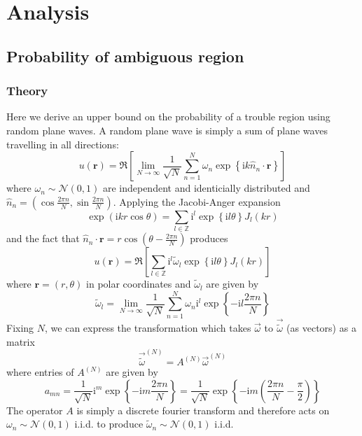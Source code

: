 \documentclass{report}
\newcommand{\rr}[0]{\mathbf{r}}
\begin{document}
\section{Analysis}

\subsection{Probability of ambiguous region}

\subsubsection{Theory}
Here we derive an upper bound on the probability of a trouble region using random plane waves. A random plane wave is simply a sum of plane waves travelling in all directions:
\[
u(\rr) = \Re \left[ \lim_{N \rightarrow \infty} \frac{1}{\sqrt{N}} \sum_{n=1}^{N} \omega_{n} \exp{\left\{\mathrm{i} k \hat{n}_{n} \cdot \rr \right\}} \right]
\]
where $\omega_{n} \sim \mathcal{N}(0,1)$ are independent and identicially distributed and $\hat{n}_{n} = (\cos \frac {2 \pi n}{N}, \sin \frac {2 \pi n}{N})$. Applying the Jacobi-Anger expansion \cite{abramowitz}
\[
\exp(\mathrm{i} k r \cos \theta) = \sum_{l \in \mathbb{Z}} \mathrm{i}^{l} \exp{\left\{\mathrm{i} l \theta \right\}} J_{l}(kr)
\]
and the fact that $\hat{n}_{n} \cdot \rr = r \cos{ \left( \theta - \frac{2 \pi n}{N} \right) }$ produces
\begin{equation}
  \label{eq:rpw_bessel_expansion}
  u(\rr) = \Re \left[ \sum_{l \in \mathbb{Z}} \mathrm{i}^{l} \tilde{\omega}_{l} \exp{\left\{\mathrm{i} l \theta \right\}} J_{l}(kr) \right]
\end{equation}
where $\rr = (r, \theta)$ in polar coordinates and $\tilde{\omega}_{l}$ are given by
\[
\tilde{\omega}_{l} = \lim_{N \rightarrow \infty} \frac{1}{\sqrt{N}} \sum_{n=1}^{N} \omega_{n} \mathrm{i}^{l} \exp{\left\{-\mathrm{i} l \frac{2 \pi n}{N} \right\}}
\]
Fixing $N$, we can express the transformation which takes $\overrightarrow{\omega}$ to $\overrightarrow{\tilde{\omega}}$ (as vectors) as a matrix
\[
\overrightarrow{\tilde{\omega}}^{(N)} = A^{(N)} \overrightarrow{\omega}^{(N)}
\]
where entries of $A^{(N)}$ are given by
\[
a_{mn} = \frac{1}{\sqrt{N}} \mathrm{i}^{m} \exp{\left\{-\mathrm{i} m \frac{2 \pi n}{N} \right\}} = \frac{1}{\sqrt{N}} \exp{\left\{-\mathrm{i} m \left(\frac{2 \pi n}{N} - \frac{\pi}{2}\right) \right\}} 
\]
The operator $A$ is simply a discrete fourier transform and therefore acts on $\omega_{n} \sim \mathcal{N}(0,1)$ i.i.d. to produce $\tilde{\omega}_{n} \sim \mathcal{N}(0, 1)$ i.i.d.
\end{document}
